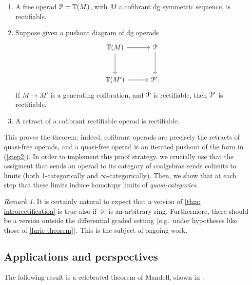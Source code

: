 \documentclass[a4paper,12pt]{amsart}
\renewcommand{\mathcal}{\EuScript}
\theoremstyle{plain}
\theoremstyle{definition}
\theoremstyle{remark}
\newtheorem{remark}[theorem]{\sc Remark}%
\newcommand{\kk}{\Bbbk}
\begin{document}
	\begin{enumerate}
		\item \label{step1}A free operad $\mathcal P = \mathbb T(M)$, with $M$ a cofibrant dg symmetric sequence, is rectifiable.
		\item \label{step2}Suppose given a pushout diagram of dg operads
        \[
        \begin{tikzcd}[column sep=2.5pc,row sep=2.5pc]
        \mathbb T(M) \arrow[r] \arrow[d] \arrow[dr, phantom,"\ulcorner" rotate=-180, very near end] &
        \mathcal P \arrow[d] \\
        \mathbb T(M') \arrow[r] &
        \mathcal P'.
        \end{tikzcd}
        \]
	If $M \longrightarrow M'$ is a generating cofibration, and $\mathcal P$ is rectifiable, then $\mathcal P'$ is rectifiable. 
		\item \label{step3} A retract of a cofibrant rectifiable operad is rectifiable.
	\end{enumerate}
	This proves the theorem: indeed, cofibrant operads are precisely the retracts of quasi-free operads, and a quasi-free operad is an iterated pushout of the form in (\ref{step2}). In order to implement this proof strategy, we crucially use that the assigment that sends an operad to its category of coalgebras sends colimits to limits (both 1-categorically and $\infty$-categorically). Then, we show that at each step that these limits induce homotopy limits of \textit{quasi-categories}.
	
	\begin{remark}
It is certainly natural to expect that a version of \cref{thm: introrectification} is true also if $\kk$ is an arbitrary ring. Furthermore, there should be a version outside the differential graded setting (e.g.~under hypotheses like those of \cref{lurie theorem}). This is the subject of ongoing work.
	\end{remark}

\subsection{Applications and perspectives}
The following result is a celebrated theorem of Mandell, shown in \cite{Mandell01}:
	
\end{document}
